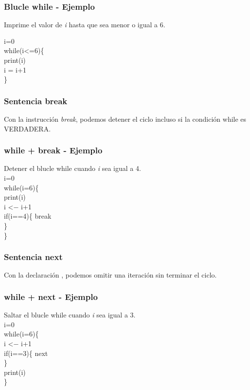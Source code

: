 \documentclass[11pt]{beamer}
\begin{document}
\begin{frame}
	\frametitle{Blucle while - Ejemplo}
	
	Imprime el valor de \textit{i} hasta que sea menor o igual a 6.\\
	\vspace{1cm}
	
	i=0\\
	
	while(i<=6)\{\\
		print(i)\\
		i = i+1\\
   \}
	
\end{frame}

	\begin{frame}
		\frametitle{Sentencia break}
		
		Con la instrucción \textit{break}, podemos detener el ciclo incluso si la condición while es VERDADERA.
		
	\end{frame}	

	\begin{frame}
		\frametitle{while + break - Ejemplo}
		
		Detener el blucle while cuando \textit{i} sea igual a 4.\\
		
		i=0\\
		
		while(i=6)\{\\
		print(i)\\
		i <$-$ i+1\\
		if(i==4)\{
			break\\
	    \}\\
		\}
		
	\end{frame}

	\begin{frame}
		\frametitle{Sentencia next}
		
		Con la  declaración , podemos omitir una iteración sin terminar el ciclo.
		
	\end{frame}

\begin{frame}
	\frametitle{while + next - Ejemplo}
	
	Saltar el blucle while cuando \textit{i} sea igual a 3.\\
	
	i=0\\
	
	while(i=6)\{\\
	i <$-$ i+1\\
	if(i==3)\{
	next\\
	\}\\
	print(i)\\
	\}
	
\end{frame}
\end{document}
